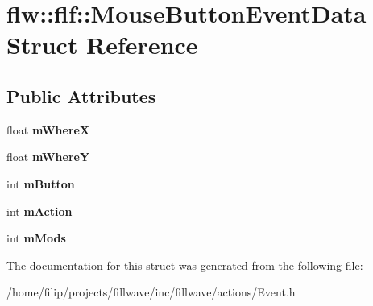 \hypertarget{structflw_1_1flf_1_1MouseButtonEventData}{}\section{flw\+:\+:flf\+:\+:Mouse\+Button\+Event\+Data Struct Reference}
\label{structflw_1_1flf_1_1MouseButtonEventData}
\subsection*{Public Attributes}
\begin{DoxyCompactItemize}
\item 
\mbox{\label{structflw_1_1flf_1_1MouseButtonEventData_a7f0e76f3957f424fb816771bd532b55b}} 
float {\bfseries m\+WhereX}
\item 
\mbox{\label{structflw_1_1flf_1_1MouseButtonEventData_a81efd270caa77b7b45e5e91424a82d97}} 
float {\bfseries m\+WhereY}
\item 
\mbox{\label{structflw_1_1flf_1_1MouseButtonEventData_a0a18ff3909e033925eb8cf1e62479930}} 
int {\bfseries m\+Button}
\item 
\mbox{\label{structflw_1_1flf_1_1MouseButtonEventData_a03847231ba8caa4af97ed1f0104e0ccf}} 
int {\bfseries m\+Action}
\item 
\mbox{\label{structflw_1_1flf_1_1MouseButtonEventData_a01cea352021993ee0596a065277f4531}} 
int {\bfseries m\+Mods}
\end{DoxyCompactItemize}


The documentation for this struct was generated from the following file\+:\begin{DoxyCompactItemize}
\item 
/home/filip/projects/fillwave/inc/fillwave/actions/Event.\+h\end{DoxyCompactItemize}
